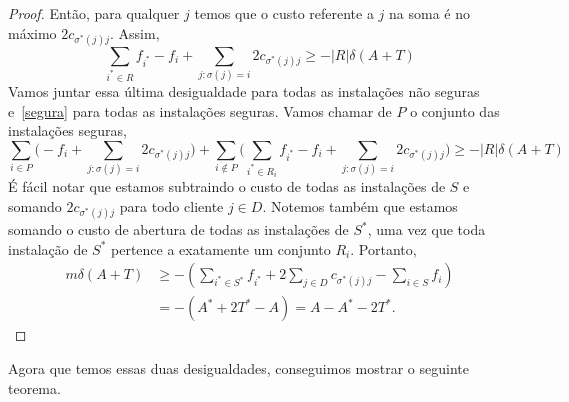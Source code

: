 \begin{proof}
    Então, para qualquer $j$ temos que o custo referente a $j$ na soma é no máximo $2c_{\sigma^*(j)j}$. Assim,
    \[\sum_{i^* \in R}f_{i^*} - f_i + \sum_{j: \sigma(j)= i } 2c_{\sigma^*(j)j} \geq - |R| \delta(A+T)\]
    Vamos juntar essa última desigualdade para todas as instalações não seguras e~\ref{segura} para todas as instalações seguras. Vamos chamar de $P$ o conjunto das instalações seguras,
    \[\sum_{i \in P}\Big( - f_i + \sum_{j:\sigma(j) = i} 2c_{\sigma^*(j)j}\Big) + \sum_{i \not \in P}\Big( \sum_{i^* \in R_i}f_{i^*} - f_i + \sum_{j: \sigma(j)= i } 2c_{\sigma^*(j)j}\Big ) \geq - |R| \delta(A+T)   \]
    É fácil notar que estamos subtraindo o custo de todas as instalações de $S$ e somando $2c_{\sigma^*(j)j}$ para todo cliente $j\in D$. Notemos também que estamos somando o custo de abertura de todas as instalações de $S^*$, uma vez que toda instalação de $S^*$ pertence a exatamente um conjunto $R_i$. Portanto,
    \begin{subequations}
        \begin{align*}
            m\delta(A+T) &\geq - (\sum_{i^* \in S^*}f_{i^*} + 2 \sum_{j \in D} c_{\sigma^*(j)j} - \sum_{i \in S} f_i)\\
            & = - ( A^* + 2 T^* - A ) = A - A^* - 2T^* .
        \end{align*}
    \end{subequations}
\end{proof}
Agora que temos essas duas desigualdades, conseguimos mostrar o seguinte teorema.

